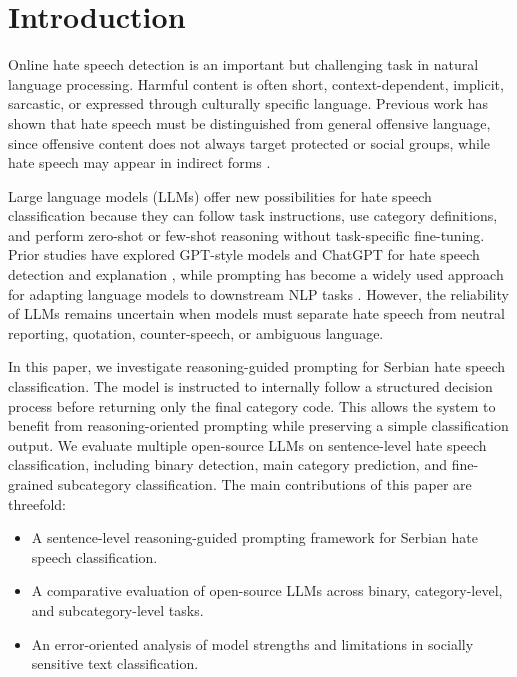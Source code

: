 \documentclass[a4paper]{article}
\begin{document}
\section{Introduction}
Online hate speech detection is an important but challenging task in natural language processing. Harmful content is often short, context-dependent, implicit, sarcastic, or expressed through culturally specific language. Previous work has shown that hate speech must be distinguished from general offensive language, since offensive content does not always target protected or social groups, while hate speech may appear in indirect forms \cite{waseem2016hateful,davidson2017automated,schmidt2017survey}.

Large language models (LLMs) offer new possibilities for hate speech classification because they can follow task instructions, use category definitions, and perform zero-shot or few-shot reasoning without task-specific fine-tuning. Prior studies have explored GPT-style models and ChatGPT for hate speech detection and explanation \cite{chiu2022detecting,huang2023chatgpt}, while prompting has become a widely used approach for adapting language models to downstream NLP tasks \cite{liu2023pre,dang2022prompt}. However, the reliability of LLMs remains uncertain when models must separate hate speech from neutral reporting, quotation, counter-speech, or ambiguous language.

In this paper, we investigate reasoning-guided prompting for Serbian hate speech classification. The model is instructed to internally follow a structured decision process before returning only the final category code. This allows the system to benefit from reasoning-oriented prompting while preserving a simple classification output. We evaluate multiple open-source LLMs on sentence-level hate speech classification, including binary detection, main category prediction, and fine-grained subcategory classification.
The main contributions of this paper are threefold:

\begin{itemize}
    \item A sentence-level reasoning-guided prompting framework for Serbian hate speech classification.
    \item A comparative evaluation of open-source LLMs across binary, category-level, and subcategory-level tasks.
    \item An error-oriented analysis of model strengths and limitations in socially sensitive text classification.
\end{itemize}
\end{document}
